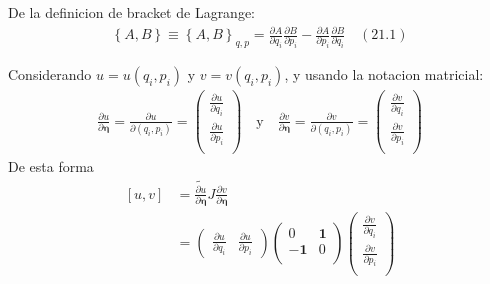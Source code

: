 \documentclass[a4paper]{article}
\begin{document}
    
    \begin{answer}[punto 21]
        De la definicion de bracket de Lagrange:
        \begin{align*}
            \left\{A,B\right\} \equiv \left\{A,B\right\}_{q,p} = \frac{\partial A}{\partial q_i} \frac{\partial B}{\partial p_i} - \frac{\partial  A}{\partial p_i} \frac{\partial B }{\partial q_i} \quad (21.1)
        \end{align*}

        Considerando $u = u(q_i, p_i)$ y $v = v(q_i, p_i)$, y usando la notacion matricial:
        \begin{align*}
            \frac{\partial u}{\partial \pmb \eta} = \frac {\partial u}{\partial (q_i, p_i)} = \begin{pmatrix}
                \frac{\partial u}{\partial q_i} \\
                \frac{\partial u}{\partial p_i} \\
            \end{pmatrix} \quad \text{y} \quad \frac{\partial v}{\partial \pmb \eta} = \frac {\partial v}{\partial (q_i, p_i)} = \begin{pmatrix}
                \frac{\partial v}{\partial q_i} \\
                \frac{\partial v}{\partial p_i} \\
            \end{pmatrix}
        \end{align*}
        De esta forma
        \begin{align*}
            \left[u,v\right] &= \tilde{\frac{\partial u}{\partial \pmb \eta}} J {\frac{\partial v}{\partial \pmb \eta}}\\
            &= \begin{pmatrix}
                \frac{\partial u}{\partial q_i} &
                \frac{\partial u}{\partial p_i} 
            \end{pmatrix} 
            \begin{pmatrix}
                0 & \mathbf 1\\
                -\mathbf 1 & 0\\
            \end{pmatrix}
            \begin{pmatrix}
                \frac{\partial v}{\partial q_i} \\
                \frac{\partial v}{\partial p_i} \\
            \end{pmatrix}\\

\end{align*}
\end{answer}
\end{document}
